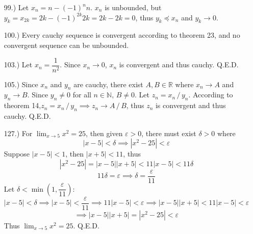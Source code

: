 \documentclass[12pt]{article}
\newcommand{\vertb}[1]{\left\vert#1\right\vert}
\newcommand{\parns}[1]{\left(#1\right)}
\newcommand{\e}{\varepsilon}
\newcommand{\di}{\,/\,}
\newcommand{\lm}[1]{\displaystyle\lim_{#1}}
\begin{document}
\begin{itemize}
    \item [99.)] Let $x_n=n-(-1)^nn$. $x_n$ is unbounded, but $y_k=x_{2k}=2k-(-1)^{2k}2k=2k-2k=0$, thus $y_k\preceq x_n$ and $y_k\to0$.

    \item [100.)] Every cauchy sequence is convergent according to theorem 23, and no convergent sequence can be unbounded.

    \item [103.)] Let $x_n=\dfrac{1}{n^2}$. Since $x_n\to0$, $x_n$ is convergent and thus cauchy. Q.E.D.

    \item [105.)] Since $x_n$ and $y_n$ are cauchy, there exist $A,B\in\mathbb{R}$ where $x_n\to A$ and $y_n\to B$. Since $y_n\ne0$ for all $n\in\mathbb{N}$, $B\ne0$. Let $z_n=x_n\di y_n$. According to theorem 14,\break $z_n=x_n\di y_n\implies z_n\to A\di B$, thus $z_n$ is convergent and thus cauchy. Q.E.D.














    \item [127.)] For $\lm{x\to5}x^2=25$, then given $\e>0$, there must exist $\delta>0$ where
    \[\vertb{x-5}<\delta\implies\vertb{x^2-25}<\e\]
    Suppose $\vertb{x-5}<1$, then $\vertb{x+5}<11$, thus 
    \[\vertb{x^2-25}=\vertb{x-5}\vertb{x+5}<11\vertb{x-5}<11\delta\]
    \[11\delta=\e\implies\delta=\frac{\e}{11}\]
    Let $\delta<\min\parns{1,\dfrac{\e}{11}}$:
    \[\vertb{x-5}<\delta\implies\vertb{x-5}<\dfrac{\e}{11}\implies11\vertb{x-5}<\e\implies\vertb{x-5}\vertb{x+5}<11\vertb{x-5}<\e\]
    \[\implies\vertb{x-5}\vertb{x+5}=\vertb{x^2-25}<\e\]
    Thus $\lm{x\to5}x^2=25$. Q.E.D.


\end{itemize}
\end{document}
